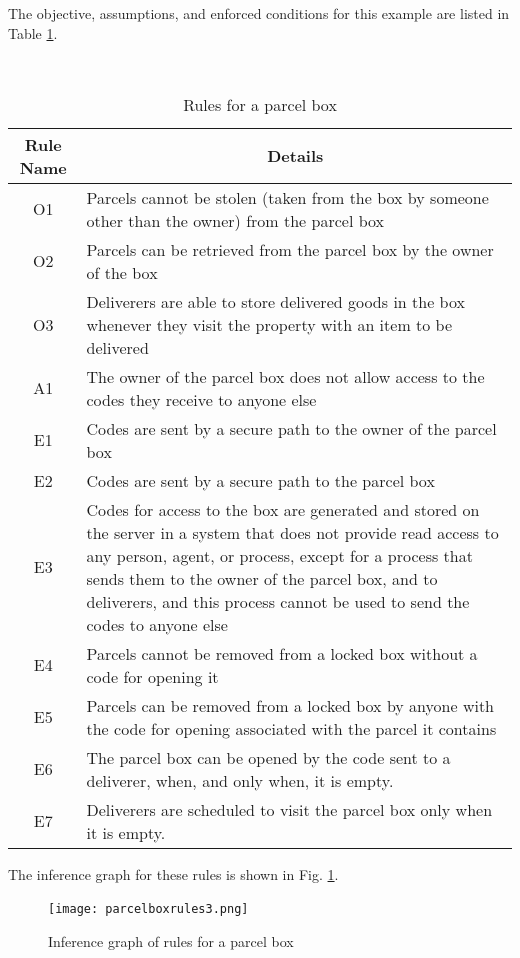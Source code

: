 The objective, assumptions, and enforced conditions for this example are listed
in Table \ref{parcelrules}.
\begin{table}[tb]
\centering
\caption{Rules for a parcel box}\label{parcelrules}\ \\
\begin{center}
\begin{tabular}{|c|p{6cm}|}
\hline
\bf Rule Name&\multicolumn{1}{|c|}{\bf Details}\\
\hline
O1 & Parcels cannot be stolen (taken from the box by someone other than the owner) from the parcel box\\
O2 & Parcels can be retrieved from the parcel box by the owner of the box\\
O3 & Deliverers are able to store delivered goods in the box whenever they visit the
property with an item to be delivered\\
A1 & The owner of the parcel box does not allow access to the codes they receive to anyone else\\
E1 & Codes are sent by a secure path to the owner of the parcel box\\
E2 & Codes are sent by a secure path to the parcel box\\
E3 & Codes for access to the box are generated and stored on the server in a system that does not 
provide read access to any person, agent, or process, except for a process that sends them to the owner 
of the parcel box, and to deliverers, and this process cannot be used to send the codes to anyone else\\
E4 & Parcels cannot be removed from a locked box without a code for opening it\\
E5 & Parcels can be removed from a locked box by anyone with the code for opening associated with the parcel it contains\\
E6 & The parcel box can be opened by the code sent to a deliverer, when, and only when, it is empty.\\
E7 & Deliverers are scheduled to visit the parcel box only when it is empty.\\
\hline
\end{tabular}
\end{center}
\end{table}

The inference graph for these rules is shown in Fig. \ref{parcelboxrules}.
\begin{figure}[bhpt]
	\begin{centering}
		\leavevmode\texttt{[image: parcelboxrules3.png]}\ \\
		\caption{Inference graph of rules for a parcel box}\label{parcelboxrules}
	\end{centering}
\end{figure}

